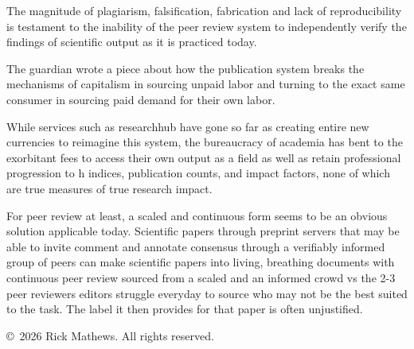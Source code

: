 \documentclass[12pt]{article}
\begin{document}
The magnitude of plagiarism, falsification, fabrication and lack of reproducibility is testament to the inability of the peer review system to independently verify the findings of scientific output as it is practiced today.

The guardian wrote a piece about how the publication system breaks the mechanisms of capitalism in sourcing unpaid labor and turning to the exact same consumer in sourcing paid demand for their own labor.

While services such as researchhub have gone so far as creating entire new currencies to reimagine this system, the bureaucracy of academia has bent to the exorbitant fees to access their own output as a field as well as retain professional progression to h indices, publication counts, and impact factors, none of which are true measures of true research impact.

For peer review at least, a scaled and continuous form seems to be an obvious solution applicable today. Scientific papers through preprint servers that may be able to invite comment and annotate consensus through a verifiably informed group of peers can make scientific papers into living, breathing documents with continuous peer review sourced from a scaled and an informed crowd vs the 2-3 peer reviewers editors struggle everyday to source who may not be the best suited to the task. The label it then provides for that paper is often unjustified.


\vspace{10pt}
{\centering\footnotesize \copyright\ 2026 Rick Mathews. All rights reserved.\par}
\end{document}
